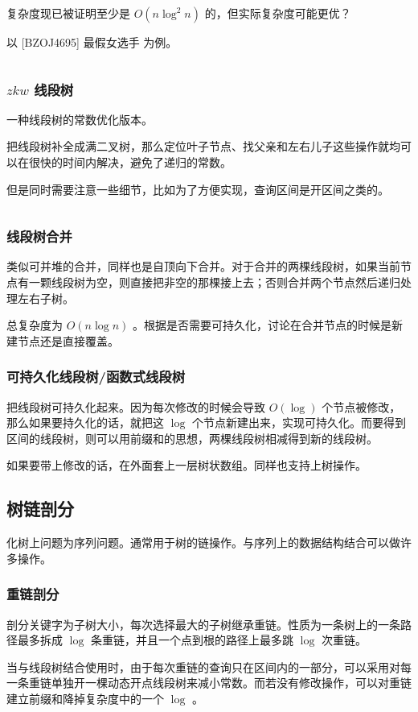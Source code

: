 \documentclass[UTF-8]{ctexart}
\newcommand{\cpp}[1]{\inputminted[bgcolor=bg,breaklines,breakanywhere=true]{c++}{#1}}
\begin{document}
			复杂度现已被证明至少是 $O(n\log^2 n)$ 的，但实际复杂度可能更优？
			
			以 [BZOJ4695] 最假女选手 为例。
			\cpp{code/Example/BZOJ4695.cpp}
			\subsubsection{$zkw$ 线段树}
			一种线段树的常数优化版本。
	
			把线段树补全成满二叉树，那么定位叶子节点、找父亲和左右儿子这些操作就均可以在很快的时间内解决，避免了递归的常数。
	
			但是同时需要注意一些细节，比如为了方便实现，查询区间是开区间之类的。
			\cpp{code/DataStruct/zkw.cpp}
			\subsubsection{线段树合并}
			类似可并堆的合并，同样也是自顶向下合并。对于合并的两棵线段树，如果当前节点有一颗线段树为空，则直接把非空的那棵接上去；否则合并两个节点然后递归处理左右子树。
	
			总复杂度为 $O(n \log n)$ 。根据是否需要可持久化，讨论在合并节点的时候是新建节点还是直接覆盖。
			\subsubsection{可持久化线段树/函数式线段树}
			把线段树可持久化起来。因为每次修改的时候会导致 $O(\log)$ 个节点被修改，那么如果要持久化的话，就把这 $\log$ 个节点新建出来，实现可持久化。而要得到区间的线段树，则可以用前缀和的思想，两棵线段树相减得到新的线段树。
	
			如果要带上修改的话，在外面套上一层树状数组。同样也支持上树操作。
		\subsection{树链剖分}
			化树上问题为序列问题。通常用于树的链操作。与序列上的数据结构结合可以做许多操作。
	
			\subsubsection{重链剖分}
			剖分关键字为子树大小，每次选择最大的子树继承重链。性质为一条树上的一条路径最多拆成 $\log$ 条重链，并且一个点到根的路径上最多跳 $\log$ 次重链。
	
			当与线段树结合使用时，由于每次重链的查询只在区间内的一部分，可以采用对每一条重链单独开一棵动态开点线段树来减小常数。而若没有修改操作，可以对重链建立前缀和降掉复杂度中的一个 $\log$ 。
\end{document}
